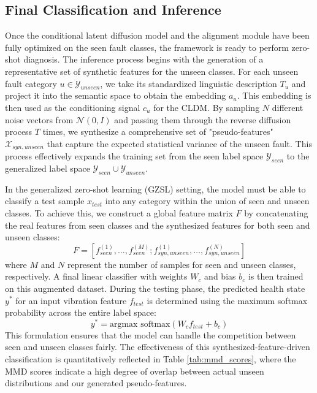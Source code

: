 \documentclass[journal]{IEEEtran}
\begin{document}
\subsection{Final Classification and Inference}
\label{sec:inference}
Once the conditional latent diffusion model and the alignment module have been fully optimized on the seen fault classes, the framework is ready to perform zero-shot diagnosis. The inference process begins with the generation of a representative set of synthetic features for the unseen classes. For each unseen fault category $u \in \mathcal{Y}_{unseen}$, we take its standardized linguistic description $T_u$ and project it into the semantic space to obtain the embedding $a_u$. This embedding is then used as the conditioning signal $c_u$ for the CLDM. By sampling $N$ different noise vectors from $\mathcal{N}(0, I)$ and passing them through the reverse diffusion process $T$ times, we synthesize a comprehensive set of "pseudo-features" $\mathcal{X}_{syn, unseen}$ that capture the expected statistical variance of the unseen fault. This process effectively expands the training set from the seen label space $\mathcal{Y}_{seen}$ to the generalized label space $\mathcal{Y}_{seen} \cup \mathcal{Y}_{unseen}$.

In the generalized zero-shot learning (GZSL) setting, the model must be able to classify a test sample $x_{test}$ into any category within the union of seen and unseen classes. To achieve this, we construct a global feature matrix $F$ by concatenating the real features from seen classes and the synthesized features for both seen and unseen classes:
\begin{equation}
F = [f_{seen}^{(1)}, \dots, f_{seen}^{(M)}; f_{syn, unseen}^{(1)}, \dots, f_{syn, unseen}^{(N)}]
\end{equation}
where $M$ and $N$ represent the number of samples for seen and unseen classes, respectively. A final linear classifier with weights $W_c$ and bias $b_c$ is then trained on this augmented dataset. During the testing phase, the predicted health state $y^*$ for an input vibration feature $f_{test}$ is determined using the maximum softmax probability across the entire label space:
\begin{equation}
y^* = \text{argmax } \text{softmax}(W_c f_{test} + b_c)
\end{equation}
This formulation ensures that the model can handle the competition between seen and unseen classes fairly. The effectiveness of this synthesized-feature-driven classification is quantitatively reflected in Table \ref{tab:mmd_scores}, where the MMD scores indicate a high degree of overlap between actual unseen distributions and our generated pseudo-features.
\end{document}
